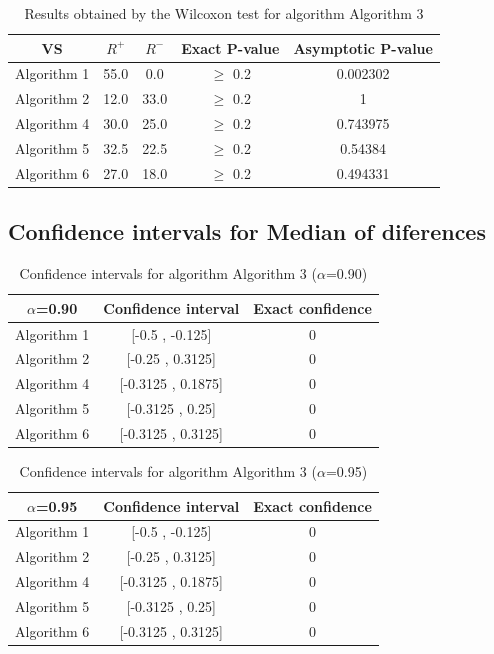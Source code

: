 \documentclass[a4paper,10pt]{article}
\begin{document}
\begin{table}[!htp]
\centering\small
\begin{tabular}{
|c|c|c|c|c|}
\hline
 VS & $R^{+}$ & $R^{-}$ & Exact P-value & Asymptotic P-value \\ \hline 
Algorithm 1 & 55.0 & 0.0 & $\geq$ 0.2 & 0.002302\\ \hline 
Algorithm 2 & 12.0 & 33.0 & $\geq$ 0.2 & 1\\ \hline 
Algorithm 4 & 30.0 & 25.0 & $\geq$ 0.2 & 0.743975\\ \hline 
Algorithm 5 & 32.5 & 22.5 & $\geq$ 0.2 & 0.54384\\ \hline 
Algorithm 6 & 27.0 & 18.0 & $\geq$ 0.2 & 0.494331\\ \hline 

\end{tabular}
\caption{Results obtained by the Wilcoxon test for algorithm Algorithm 3}
\end{table}

\subsection{Confidence intervals for Median of diferences}

\begin{table}[!htp]
\centering\small
\begin{tabular}{
|c|c|c|}
\hline
 $\alpha$=0.90 & Confidence interval & Exact confidence \\ \hline 
Algorithm 1 & [-0.5 , -0.125] & 0\\ \hline 
Algorithm 2 & [-0.25 , 0.3125] & 0\\ \hline 
Algorithm 4 & [-0.3125 , 0.1875] & 0\\ \hline 
Algorithm 5 & [-0.3125 , 0.25] & 0\\ \hline 
Algorithm 6 & [-0.3125 , 0.3125] & 0\\ \hline 

\end{tabular}
\caption{Confidence intervals for algorithm Algorithm 3 ($\alpha$=0.90)}
\end{table}
\begin{table}[!htp]
\centering\small
\begin{tabular}{
|c|c|c|}
\hline
 $\alpha$=0.95 & Confidence interval & Exact confidence \\ \hline 
Algorithm 1 & [-0.5 , -0.125] & 0\\ \hline 
Algorithm 2 & [-0.25 , 0.3125] & 0\\ \hline 
Algorithm 4 & [-0.3125 , 0.1875] & 0\\ \hline 
Algorithm 5 & [-0.3125 , 0.25] & 0\\ \hline 
Algorithm 6 & [-0.3125 , 0.3125] & 0\\ \hline 

\end{tabular}
\caption{Confidence intervals for algorithm Algorithm 3 ($\alpha$=0.95)}
\end{table}
\end{document}
